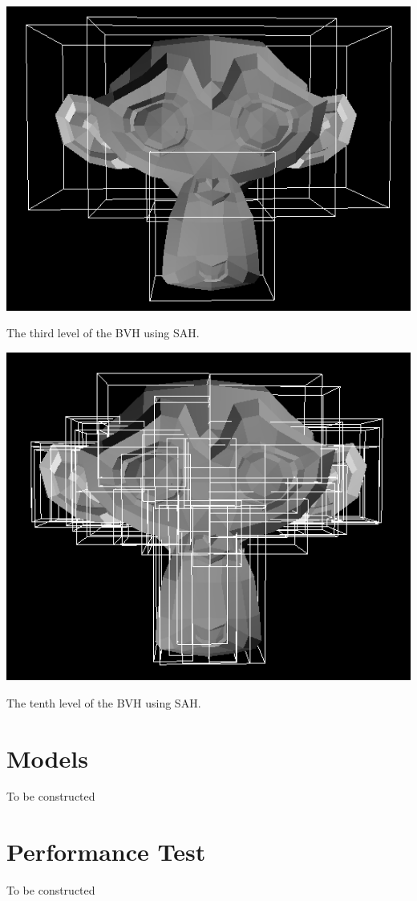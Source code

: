 \documentclass{article}
\begin{document}
\begin{center}
        \includegraphics[scale=0.75]{images/bvh_level_three.png}

        The third level of the BVH using SAH.

        \includegraphics[scale=0.75]{images/bvh_level_ten.png}

        The tenth level of the BVH using SAH.
    \end{center}

    \section{Models}
    To be constructed

    \section{Performance Test}
    To be constructed
\end{document}
